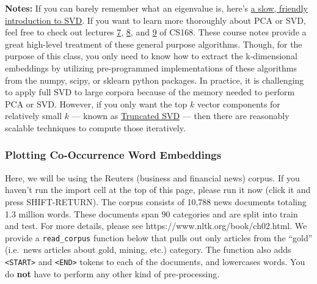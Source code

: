 \documentclass[11pt]{article}
\begin{document}
\textbf{Notes:} If you can barely remember what an eigenvalue is, here's
\href{https://davetang.org/file/Singular_Value_Decomposition_Tutorial.pdf}{a
    slow, friendly introduction to SVD}. If you want to learn more
thoroughly about PCA or SVD, feel free to check out lectures
\href{https://web.stanford.edu/class/cs168/l/l7.pdf}{7},
\href{http://theory.stanford.edu/~tim/s15/l/l8.pdf}{8}, and
\href{https://web.stanford.edu/class/cs168/l/l9.pdf}{9} of CS168. These
course notes provide a great high-level treatment of these general
purpose algorithms. Though, for the purpose of this class, you only need
to know how to extract the k-dimensional embeddings by utilizing
pre-programmed implementations of these algorithms from the numpy,
scipy, or sklearn python packages. In practice, it is challenging to
apply full SVD to large corpora because of the memory needed to perform
PCA or SVD. However, if you only want the top \(k\) vector components
for relatively small \(k\) --- known as
\href{https://en.wikipedia.org/wiki/Singular_value_decomposition\#Truncated_SVD}{Truncated
    SVD} --- then there are reasonably scalable techniques to compute those
iteratively.

\subsubsection{Plotting Co-Occurrence Word
    Embeddings}\label{plotting-co-occurrence-word-embeddings}

Here, we will be using the Reuters (business and financial news) corpus.
If you haven't run the import cell at the top of this page, please run
it now (click it and press SHIFT-RETURN). The corpus consists of 10,788
news documents totaling 1.3 million words. These documents span 90
categories and are split into train and test. For more details, please
see https://www.nltk.org/book/ch02.html. We provide a
\texttt{read\_corpus} function below that pulls out only articles from
the ``gold'' (i.e.~news articles about gold, mining, etc.) category. The
function also adds \texttt{\textless{}START\textgreater{}} and
\texttt{\textless{}END\textgreater{}} tokens to each of the documents,
and lowercases words. You do \textbf{not} have to perform any other kind
of pre-processing.
\end{document}
